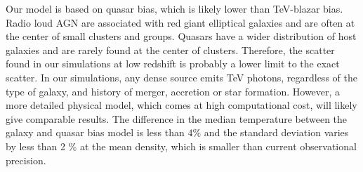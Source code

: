 \documentclass[twocolumns]{emulateapj}
\begin{document}
{Our model is based on quasar bias, which is likely lower than TeV-blazar bias. Radio loud AGN are associated with red giant elliptical galaxies \citep{2007A&A...476..723H} and are often at the center of small clusters and groups. Quasars have a wider distribution of host galaxies and are rarely found at the center of clusters. Therefore, the scatter found in our simulations at low redshift is probably a lower limit to the exact scatter. In our simulations, any dense source emits TeV photons, regardless of the type of galaxy, and history of merger, accretion  or star formation.  However, a more detailed physical model, which comes at high computational cost, will likely give comparable results. The difference in the median temperature between the galaxy and quasar bias model  is less than $4\%$  and the standard deviation varies by less than 2 $\%$ at the mean density, which is smaller than current observational precision. 




}


 




\end{document}
